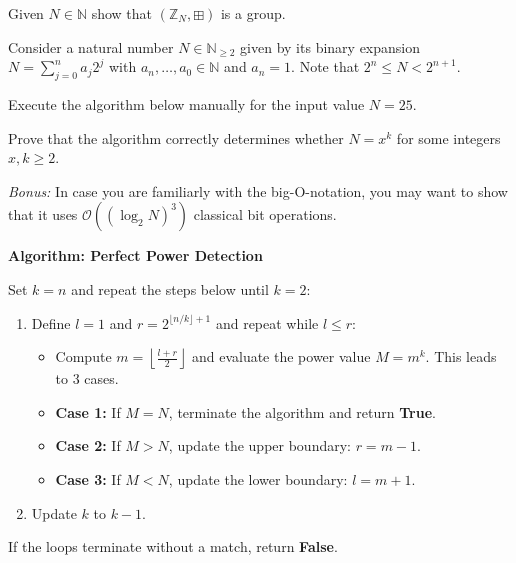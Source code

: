 \documentclass[a4paper, oneside, 12pt]{amsart}
\begin{document}
\begin{exercise}
  Given \(N \in \mathbb{N}\) show that \(( \mathbb{Z}_{N}, \boxplus)\) is a group.
\end{exercise}


\begin{exercise}\label{exe:prime-power-test}
  Consider a natural number \(N \in \mathbb{N}_{\geq 2}\) given by its binary expansion \(N = \sum_{j=0}^{n} a_j 2^j\) with  \(a_{n}, \dots , a_{0}\in \mathbb{N}\) and \(a_n = 1\).
  Note that \(2^n \leq N < 2^{n+1}\).
  \begin{thmlist}
    \item Execute the algorithm below manually for the input value \(N = 25\).
    \item Prove that the algorithm correctly determines whether \(N = x^k\) for some integers \(x, k \geq 2\).
    \item \textit{Bonus:} In case you are familiarly with the big-O-notation, you may want to show that it uses \(\mathcal{O}((\log_{2} N)^3)\) classical bit operations.
  \end{thmlist}

  \noindent\textbf{Algorithm: Perfect Power Detection}
  \begin{thmlist}
    \item Set \(k=n\) and repeat the steps below until \(k=2\):
    \begin{enumerate}
      \item Define \(l = 1\) and \(r = 2^{\lfloor n/k \rfloor + 1}\) and repeat while \(l \leq r\):
      \begin{itemize}
        \item Compute \(m = \left\lfloor \frac{l + r}{2} \right\rfloor\) and evaluate the power value \(M = m^k\). This leads to 3 cases.
        \item \textbf{Case 1:} If \(M = N\), terminate the algorithm and return \textbf{True}.
        \item \textbf{Case 2:} If \(M > N\), update the upper boundary: \(r = m - 1\).
        \item \textbf{Case 3:} If \(M < N\), update the lower boundary: \(l = m + 1\).
      \end{itemize}
      \item Update \(k\) to \(k-1\).
    \end{enumerate}
    \item If the loops terminate without a match, return \textbf{False}.
  \end{thmlist}
\end{exercise}
\end{document}
